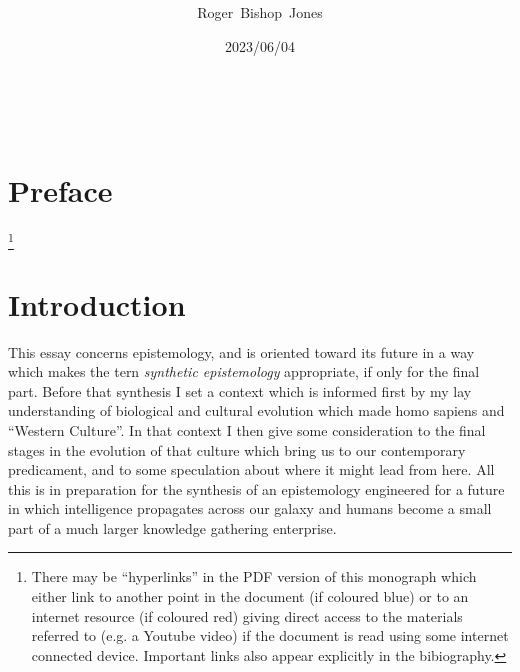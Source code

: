 \documentclass[10pt,titlepage]{article}
\title{\LARGE\bf }
\author{Roger~Bishop~Jones}
\date{\small 2023/06/04}
\newcommand{\ignore}[1]{}
\begin{document}
                               
\begin{titlepage}
\maketitle





\end{titlepage}

\ \

\ignore{
\begin{centering}
{}
\end{centering}
}%

\setcounter{tocdepth}{2}
{\parskip-0pt\tableofcontents}


\pagebreak

\section*{Preface}


\footnote{There may be ``hyperlinks'' in the PDF version of this monograph which either link to another point in the document  (if coloured blue) or to an internet resource  (if coloured red) giving direct access to the materials referred to (e.g. a Youtube video) if the document is read using some internet connected device.
Important links also appear explicitly in the bibiography.}

\section{Introduction}

This essay concerns epistemology, and is oriented toward its future in a way which makes  the tern \emph{synthetic epistemology} appropriate, if only for the final part.
Before that synthesis I set a context which is informed first by my lay understanding of biological and cultural evolution which made homo sapiens and ``Western Culture''.
In that context I then give some consideration to the final stages in the evolution of that culture which bring us to our contemporary predicament, and to some speculation about where it might lead from here.
All this is in preparation for the synthesis of an epistemology engineered for a future in which intelligence propagates across our galaxy and humans become a small part of a much larger knowledge gathering enterprise.
\end{document}
